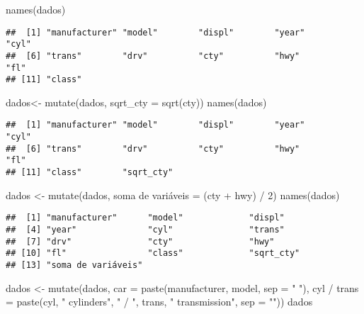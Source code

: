 \documentclass[
]{book}
\newenvironment{Shaded}{\begin{snugshade}}{\end{snugshade}}
\newcommand{\AttributeTok}[1]{\textcolor[rgb]{0.77,0.63,0.00}{#1}}
\newcommand{\DecValTok}[1]{\textcolor[rgb]{0.00,0.00,0.81}{#1}}
\newcommand{\FunctionTok}[1]{\textcolor[rgb]{0.00,0.00,0.00}{#1}}
\newcommand{\NormalTok}[1]{#1}
\newcommand{\OtherTok}[1]{\textcolor[rgb]{0.56,0.35,0.01}{#1}}
\newcommand{\SpecialCharTok}[1]{\textcolor[rgb]{0.00,0.00,0.00}{#1}}
\newcommand{\StringTok}[1]{\textcolor[rgb]{0.31,0.60,0.02}{#1}}
\begin{document}
\begin{Shaded}
\begin{Highlighting}[]
\FunctionTok{names}\NormalTok{(dados)}
\end{Highlighting}
\end{Shaded}

\begin{verbatim}
##  [1] "manufacturer" "model"        "displ"        "year"         "cyl"         
##  [6] "trans"        "drv"          "cty"          "hwy"          "fl"          
## [11] "class"
\end{verbatim}

\begin{Shaded}
\begin{Highlighting}[]
\NormalTok{dados}\OtherTok{\textless{}{-}} \FunctionTok{mutate}\NormalTok{(dados, }\AttributeTok{sqrt\_cty =} \FunctionTok{sqrt}\NormalTok{(cty))}
\FunctionTok{names}\NormalTok{(dados)}
\end{Highlighting}
\end{Shaded}

\begin{verbatim}
##  [1] "manufacturer" "model"        "displ"        "year"         "cyl"         
##  [6] "trans"        "drv"          "cty"          "hwy"          "fl"          
## [11] "class"        "sqrt_cty"
\end{verbatim}

\begin{Shaded}
\begin{Highlighting}[]
\NormalTok{dados }\OtherTok{\textless{}{-}} \FunctionTok{mutate}\NormalTok{(dados,}
\StringTok{\textasciigrave{}}\AttributeTok{soma de variáveis}\StringTok{\textasciigrave{}} \OtherTok{=}\NormalTok{ (cty }\SpecialCharTok{+}\NormalTok{ hwy) }\SpecialCharTok{/} \DecValTok{2}\NormalTok{)}
\FunctionTok{names}\NormalTok{(dados)}
\end{Highlighting}
\end{Shaded}

\begin{verbatim}
##  [1] "manufacturer"      "model"             "displ"            
##  [4] "year"              "cyl"               "trans"            
##  [7] "drv"               "cty"               "hwy"              
## [10] "fl"                "class"             "sqrt_cty"         
## [13] "soma de variáveis"
\end{verbatim}

\begin{Shaded}
\begin{Highlighting}[]
\NormalTok{dados }\OtherTok{\textless{}{-}} \FunctionTok{mutate}\NormalTok{(dados,}
             \AttributeTok{car =} \FunctionTok{paste}\NormalTok{(manufacturer, model, }\AttributeTok{sep =} \StringTok{" "}\NormalTok{),}
             \StringTok{\textasciigrave{}}\AttributeTok{cyl / trans}\StringTok{\textasciigrave{}} \OtherTok{=} \FunctionTok{paste}\NormalTok{(cyl, }\StringTok{" cylinders"}\NormalTok{, }\StringTok{" / "}\NormalTok{, trans, }\StringTok{" transmission"}\NormalTok{, }\AttributeTok{sep =} \StringTok{""}\NormalTok{))}
\NormalTok{dados}
\end{Highlighting}
\end{Shaded}
\end{document}
